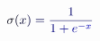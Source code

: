 \documentclass[12pt]{article}
\begin{document}
\makeatletter
\renewcommand*{\@textcolor}[3]{%
  \protect\leavevmode
  \begingroup
    \color#1{#2}#3%
  \endgroup
}
\makeatother
\begin{displaymath}
\mathcolor[RGB]{0,0,15}{\sigma} \mathcolor[RGB]{0,0,30}{(} \mathcolor[RGB]{0,0,45}{x} \mathcolor[RGB]{0,0,60}{)} \mathcolor[RGB]{0,0,75}{=} \mathcolor[RGB]{0,0,90}{\frac { \mathcolor[RGB]{0,0,105}{1} } { \mathcolor[RGB]{0,0,120}{1} \mathcolor[RGB]{0,0,135}{+} \mathcolor[RGB]{0,0,150}{e} ^ { \mathcolor[RGB]{0,0,165}{-} \mathcolor[RGB]{0,0,180}{x} } } }
\end{displaymath}
\end{document}
